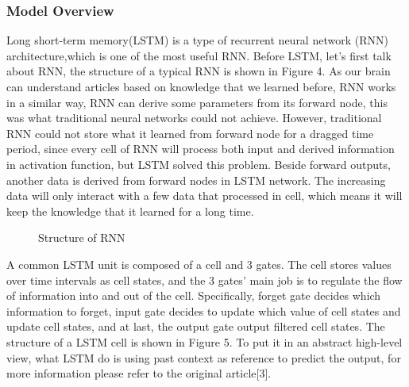\documentclass{article}
\begin{document}
\subsubsection{Model Overview}
Long short-term memory(LSTM) is a type of recurrent neural network (RNN) architecture,which is one of the most useful RNN.  Before LSTM, let's first talk about RNN, the structure of a typical RNN is shown in Figure 4. As our brain can understand articles based on knowledge that we learned before, RNN works in a similar way, RNN can derive some parameters from its forward node, this was what traditional neural networks could not achieve. However, traditional RNN could not store what it learned from forward node for a dragged time period, since every cell of RNN will process both input and derived information in activation function, but LSTM solved this problem. Beside forward outputs, another data is derived from forward nodes in LSTM network. The increasing data will only interact with a few data that processed in cell, which means it will keep the knowledge that it learned for a long time.
\begin{figure}[H]
  \centering
  \caption{Structure of RNN}
\end{figure}

A common LSTM unit is composed of a cell and 3 gates. The cell stores values over time intervals as cell states, and the 3 gates’ main job is to regulate the flow of information into and out of the cell. Specifically, forget gate decides which information to forget, input gate decides to update which value of cell states and update cell states, and at last, the output gate output filtered cell states. The structure of a LSTM cell is shown in Figure 5. To put it in an abstract high-level view, what LSTM do is using past context as reference to predict the output, for more information please refer to the original article[3].
\end{document}

